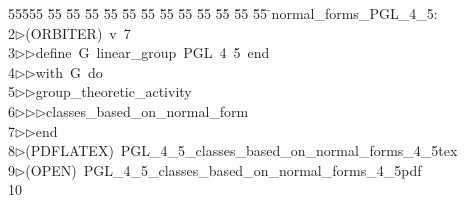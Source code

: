 %
%
\begin{tabbing}
55555 \= 55 \= 55 \= 55 \= 55 \= 55 \= 55 \= 55 \= 55 \= 55 \= 55 \= 55 \= 55 \= \>normal\_forms\_PGL\_4\_5:\\[0pt]
2\>$\triangleright$\>(ORBITER)\ v\ 7\ \\[0pt]
3\>$\triangleright$\>$\triangleright$\>define\ G\ linear\_group\ PGL\ 4\ 5\ end\ \\[0pt]
4\>$\triangleright$\>$\triangleright$\>with\ G\ do\ \\[0pt]
5\>$\triangleright$\>$\triangleright$\>group\_theoretic\_activity\ \\[0pt]
6\>$\triangleright$\>$\triangleright$\>$\triangleright$\>classes\_based\_on\_normal\_form\ \\[0pt]
7\>$\triangleright$\>$\triangleright$\>end\\[0pt]
8\>$\triangleright$\>(PDFLATEX)\ PGL\_4\_5\_classes\_based\_on\_normal\_forms\_4\_5tex\\[0pt]
9\>$\triangleright$\>(OPEN)\ PGL\_4\_5\_classes\_based\_on\_normal\_forms\_4\_5pdf\\[0pt]
10\>\end{tabbing}
